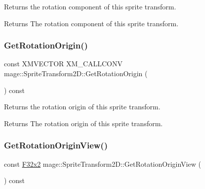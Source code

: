 Returns the rotation component of this sprite transform.

\begin{DoxyReturn}{Returns}
The rotation component of this sprite transform. 
\end{DoxyReturn}
\mbox{\label{classmage_1_1_sprite_transform2_d_a071b4bda311b27033ef24a56073e9f42}} 
\subsubsection{\texorpdfstring{Get\+Rotation\+Origin()}{GetRotationOrigin()}}
{\footnotesize\ttfamily const X\+M\+V\+E\+C\+T\+OR X\+M\+\_\+\+C\+A\+L\+L\+C\+O\+NV mage\+::\+Sprite\+Transform2\+D\+::\+Get\+Rotation\+Origin (\begin{DoxyParamCaption}{ }\end{DoxyParamCaption}) const\hspace{0.3cm}{\ttfamily [noexcept]}}

Returns the rotation origin of this sprite transform.

\begin{DoxyReturn}{Returns}
The rotation origin of this sprite transform. 
\end{DoxyReturn}
\mbox{\label{classmage_1_1_sprite_transform2_d_a0a9ef95aac2534bae9e9408e57165c55}} 
\subsubsection{\texorpdfstring{Get\+Rotation\+Origin\+View()}{GetRotationOriginView()}}
{\footnotesize\ttfamily const \mbox{\hyperlink{namespacemage_aee4759dedc8def6c6dec26b5c7eddf29}{F32x2}} mage\+::\+Sprite\+Transform2\+D\+::\+Get\+Rotation\+Origin\+View (\begin{DoxyParamCaption}{ }\end{DoxyParamCaption}) const\hspace{0.3cm}{\ttfamily [noexcept]}}

